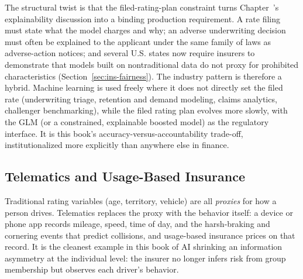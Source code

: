 \documentclass[../ai_in_finance]{subfiles}
\begin{document}
The structural twist is that the filed-rating-plan constraint turns Chapter~'s explainability discussion into a binding production requirement. A rate filing must state what the model charges and why; an adverse underwriting decision must often be explained to the applicant under the same family of laws as adverse-action notices; and several U.S. states now require insurers to demonstrate that models built on nontraditional data do not proxy for prohibited characteristics (Section~\ref{sec:ins-fairness}). The industry pattern is therefore a hybrid. Machine learning is used freely where it does not directly set the filed rate (underwriting triage, retention and demand modeling, claims analytics, challenger benchmarking), while the filed rating plan evolves more slowly, with the GLM (or a constrained, explainable boosted model) as the regulatory interface. It is this book's accuracy-versus-accountability trade-off, institutionalized more explicitly than anywhere else in finance.

\subsection{Telematics and Usage-Based Insurance}
\label{sec:ins-telematics}

Traditional rating variables (age, territory, vehicle) are all \emph{proxies} for how a person drives. Telematics replaces the proxy with the behavior itself: a device or phone app records mileage, speed, time of day, and the harsh-braking and cornering events that predict collisions, and usage-based insurance prices on that record. It is the cleanest example in this book of AI shrinking an information asymmetry at the individual level: the insurer no longer infers risk from group membership but observes each driver's behavior.
\end{document}
